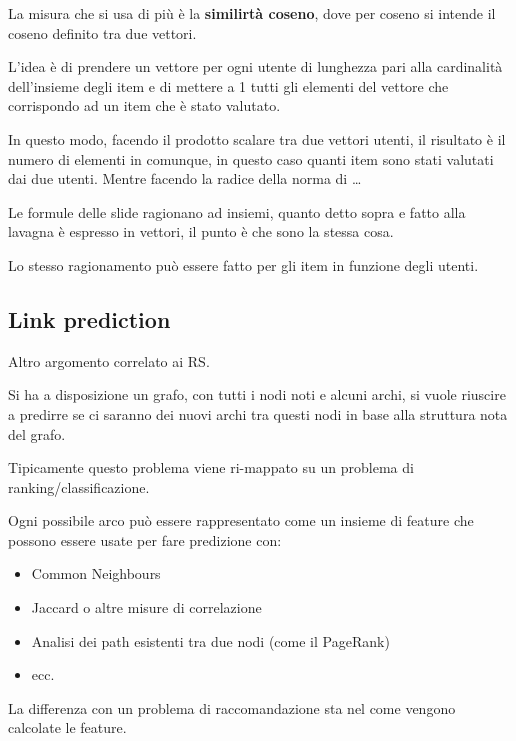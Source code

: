 La misura che si usa di più è la \textbf{similirtà coseno}, dove per coseno si intende il coseno definito tra due vettori.

L'idea è di prendere un vettore per ogni utente di lunghezza pari alla
cardinalità dell'insieme degli item e di mettere a 1 tutti gli elementi
del vettore che corrispondo ad un item che è stato valutato.

In questo modo, facendo il prodotto scalare tra due vettori utenti, il
risultato è il numero di elementi in comunque, in questo caso quanti
item sono stati valutati dai due utenti. Mentre facendo la radice della
norma di \ldots{}

Le formule delle slide ragionano ad insiemi, quanto detto sopra e fatto
alla lavagna è espresso in vettori, il punto è che sono la stessa cosa.

Lo stesso ragionamento può essere fatto per gli item in funzione degli
utenti.

\subsection{Link prediction}\label{link-prediction}

Altro argomento correlato ai RS.

Si ha a disposizione un grafo, con tutti i nodi noti e alcuni archi, si
vuole riuscire a predirre se ci saranno dei nuovi archi tra questi nodi
in base alla struttura nota del grafo.

Tipicamente questo problema viene ri-mappato su un problema di
ranking/classificazione.

Ogni possibile arco può essere rappresentato come un insieme di feature
che possono essere usate per fare predizione con:

\begin{itemize}
\item
  Common Neighbours
\item
  Jaccard o altre misure di correlazione
\item
  Analisi dei path esistenti tra due nodi (come il PageRank)
\item
  ecc.
\end{itemize}

La differenza con un problema di raccomandazione sta nel come vengono
calcolate le feature.
